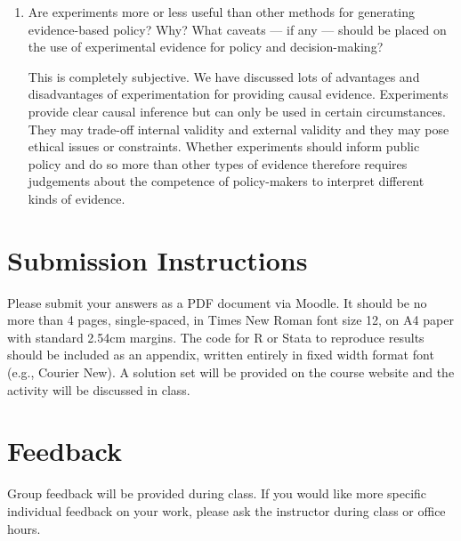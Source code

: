 \documentclass[a4paper,12pt]{exam}
\begin{document}
\begin{enumerate}
\begin{solution}
\end{solution}

\item Are experiments more or less useful than other methods for generating evidence-based policy? Why? What caveats --- if any --- should be placed on the use of experimental evidence for policy and decision-making?

\begin{solution}
This is completely subjective. We have discussed lots of advantages and disadvantages of experimentation for providing causal evidence. Experiments provide clear causal inference but can only be used in certain circumstances. They may trade-off internal validity and external validity and they may pose ethical issues or constraints. Whether experiments should inform public policy and do so more than other types of evidence therefore requires judgements about the competence of policy-makers to interpret different kinds of evidence.
\end{solution}

\end{enumerate}

\section{Submission Instructions}\label{submission-instructions}

Please submit your answers as a PDF document via Moodle. It should be no more than 4 pages, single-spaced, in Times New Roman font size 12, on A4 paper with standard 2.54cm margins. The code for R or Stata to reproduce results should be included as an appendix, written entirely in fixed width format font (e.g., Courier New). A solution set will be provided on the course website and the activity will be discussed in class.

\section{Feedback}\label{feedback}

Group feedback will be provided during class. If you would like more specific individual feedback on your work, please ask the instructor during class or office hours.
\end{document}
